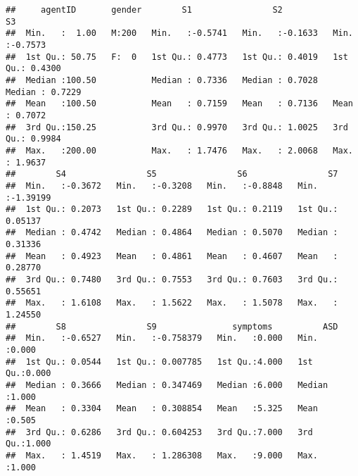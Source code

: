 \documentclass[]{article}
\newenvironment{Shaded}{\begin{snugshade}}{\end{snugshade}}
\newcommand{\KeywordTok}[1]{\textcolor[rgb]{0.13,0.29,0.53}{\textbf{#1}}}
\newcommand{\StringTok}[1]{\textcolor[rgb]{0.31,0.60,0.02}{#1}}
\newcommand{\CommentTok}[1]{\textcolor[rgb]{0.56,0.35,0.01}{\textit{#1}}}
\newcommand{\OperatorTok}[1]{\textcolor[rgb]{0.81,0.36,0.00}{\textbf{#1}}}
\newcommand{\AlertTok}[1]{\textcolor[rgb]{0.94,0.16,0.16}{#1}}
\newcommand{\NormalTok}[1]{#1}
\begin{document}
\begin{Shaded}
\end{Shaded}

\begin{verbatim}
##     agentID       gender        S1                S2                S3         
##  Min.   :  1.00   M:200   Min.   :-0.5741   Min.   :-0.1633   Min.   :-0.7573  
##  1st Qu.: 50.75   F:  0   1st Qu.: 0.4773   1st Qu.: 0.4019   1st Qu.: 0.4300  
##  Median :100.50           Median : 0.7336   Median : 0.7028   Median : 0.7229  
##  Mean   :100.50           Mean   : 0.7159   Mean   : 0.7136   Mean   : 0.7072  
##  3rd Qu.:150.25           3rd Qu.: 0.9970   3rd Qu.: 1.0025   3rd Qu.: 0.9984  
##  Max.   :200.00           Max.   : 1.7476   Max.   : 2.0068   Max.   : 1.9637  
##        S4                S5                S6                S7          
##  Min.   :-0.3672   Min.   :-0.3208   Min.   :-0.8848   Min.   :-1.39199  
##  1st Qu.: 0.2073   1st Qu.: 0.2289   1st Qu.: 0.2119   1st Qu.: 0.05137  
##  Median : 0.4742   Median : 0.4864   Median : 0.5070   Median : 0.31336  
##  Mean   : 0.4923   Mean   : 0.4861   Mean   : 0.4607   Mean   : 0.28770  
##  3rd Qu.: 0.7480   3rd Qu.: 0.7553   3rd Qu.: 0.7603   3rd Qu.: 0.55651  
##  Max.   : 1.6108   Max.   : 1.5622   Max.   : 1.5078   Max.   : 1.24550  
##        S8                S9               symptoms          ASD       
##  Min.   :-0.6527   Min.   :-0.758379   Min.   :0.000   Min.   :0.000  
##  1st Qu.: 0.0544   1st Qu.: 0.007785   1st Qu.:4.000   1st Qu.:0.000  
##  Median : 0.3666   Median : 0.347469   Median :6.000   Median :1.000  
##  Mean   : 0.3304   Mean   : 0.308854   Mean   :5.325   Mean   :0.505  
##  3rd Qu.: 0.6286   3rd Qu.: 0.604253   3rd Qu.:7.000   3rd Qu.:1.000  
##  Max.   : 1.4519   Max.   : 1.286308   Max.   :9.000   Max.   :1.000
\end{verbatim}
\end{document}
